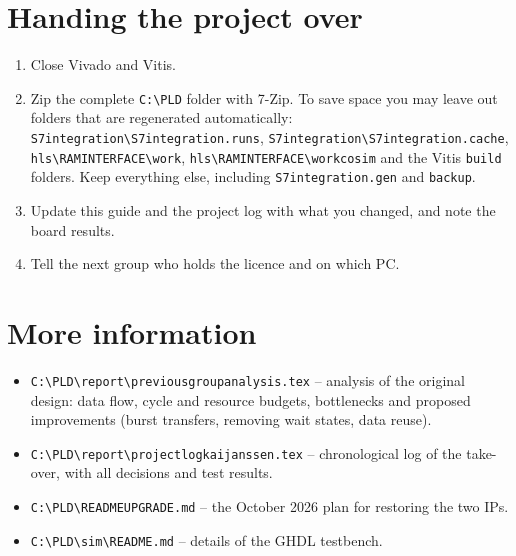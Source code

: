 \documentclass[11pt,a4paper]{article}
\newcommand{\code}[1]{\texttt{#1}}
\newcommand{\bs}{\textbackslash\allowbreak{}}
\renewcommand{\_}{\oldunderscore\allowbreak{}}
\newcommand{\pld}[1]{\code{C:\bs PLD\bs #1}}
\begin{document}
\section{Handing the project over}
\begin{enumerate}[noitemsep]
  \item Close Vivado and Vitis.
  \item Zip the complete \code{C:\bs PLD} folder with 7-Zip. To save space you may leave out folders that are regenerated automatically: \code{S7\_integration\bs S7\_integration.runs}, \code{S7\_integration\bs S7\_integration.cache}, \code{hls\bs RAM\_INTERFACE\bs work}, \code{hls\bs RAM\_INTERFACE\bs work\_cosim} and the Vitis \code{build} folders. Keep everything else, including \code{S7\_integration.gen} and \code{backup}.
  \item Update this guide and the project log with what you changed, and note the board results.
  \item Tell the next group who holds the licence and on which PC.
\end{enumerate}

\section{More information}\label{sec:moreinfo}
\begin{itemize}[noitemsep]
  \item \pld{report\bs previous\_group\_analysis.tex} -- analysis of the original design: data flow, cycle and resource budgets, bottlenecks and proposed improvements (burst transfers, removing wait states, data reuse).
  \item \pld{report\bs project\_log\_kai\_janssen.tex} -- chronological log of the take-over, with all decisions and test results.
  \item \pld{README\_UPGRADE.md} -- the October 2026 plan for restoring the two IPs.
  \item \pld{sim\bs README.md} -- details of the GHDL testbench.
\end{itemize}
\end{document}
